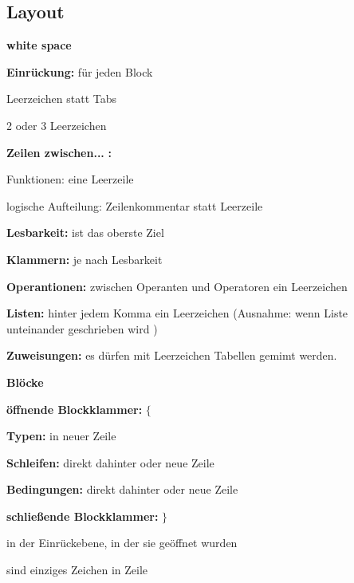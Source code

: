 \documentclass[
   draft=false
  ,paper=a4
  ,twoside=false
  ,fontsize=11pt
  ,headsepline
  ,DIV=11
  ,parskip=full+
  ,titlepage
]{scrartcl} %
\begin{document}
\subsection{Layout}
\begin{minipage}[t]{0.45\linewidth}

  \large{\textbf{white space}}\normalsize 
  \begin{compactitem}
    \item[\textbf{Einrückung:}] für jeden Block
    \begin{compactitem}
      \item Leerzeichen statt Tabs
      \item 2 oder 3 Leerzeichen
    \end{compactitem}
    \item[\textbf{Zeilen zwischen...}]\textbf{:}
    \begin{compactitem}
      \item[Funktionen:] eine Leerzeile
      \item[logische Aufteilung:] Zeilenkommentar statt Leerzeile
    \end{compactitem}
    \item[\textbf{Lesbarkeit:}] ist das oberste Ziel
    \begin{compactitem}
      \item \textbf{Klammern:} je nach Lesbarkeit 
      \item \textbf{Operantionen:} zwischen Operanten 
      und Operatoren ein Leerzeichen
      \item \textbf{Listen:} hinter jedem Komma ein Leerzeichen 
      (Ausnahme: wenn Liste unteinander geschrieben wird )
      \item \textbf{Zuweisungen:} es dürfen mit Leerzeichen Tabellen gemimt werden.
    \end{compactitem}
  \end{compactitem}
  
  \large{\textbf{Blöcke}}\normalsize 
  \begin{compactitem}
  \item[\textbf{öffnende Blockklammer:}] $\{$
  
  \begin{compactitem}
    \item \textbf{Typen:} in neuer Zeile
    \item \textbf{Schleifen:} direkt dahinter oder neue Zeile
    \item \textbf{Bedingungen:} direkt dahinter oder neue Zeile
  \end{compactitem}
  \item[\textbf{schließende Blockklammer:}] $\}$
    \item in der Einrückebene, in der sie geöffnet wurden
    \item sind einziges Zeichen in Zeile
  \end{compactitem}
  

\end{minipage}
\end{document}
